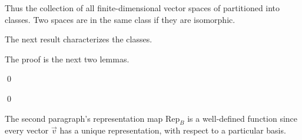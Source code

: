 \documentclass[10pt,t,serif,professionalfont]{beamer}
\begin{document}
\begin{frame}
Thus the collection of all finite-dimensional vector spaces
of partitioned into classes.
Two spaces are in the same class if they are isomorphic.

The next result characterizes the classes.
\end{frame}




\begin{frame}
\th[th:NDimSpaceIsoRN]

\medskip
The proof is the next two lemmas.
\medskip

\pause
{}

\pause
\pf
{}
\end{frame}
\begin{frame}
\qed
\end{frame}




\begin{frame}

\pause
\pf
{}

\pause
{}
\end{frame}
\begin{frame}

\pause
{}
\end{frame}
\begin{frame}
\qed

\pause
\medskip
\no
The second paragraph's 
representation map $\text{Rep}_B$ is a well-defined function since
every vector $\vec{v}$ has a unique representation, with respect to
a particular basis.
\end{frame}
\end{document}
